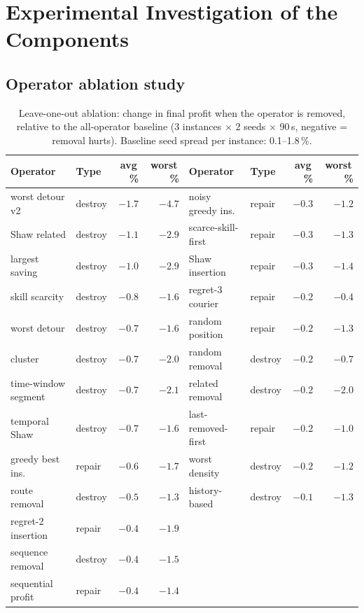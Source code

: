\documentclass[10pt, a4paper]{article}
\begin{document}
\section{Experimental Investigation of the Components}
\subsection{Operator ablation study}

\begin{table}[t]
\centering\footnotesize
\caption{Leave-one-out ablation: change in final profit when the operator is
removed, relative to the all-operator baseline (3 instances $\times$ 2 seeds
$\times$ 90\,s, negative = removal hurts). Baseline seed spread per instance:
0.1--1.8\,\%.}
\label{tab:ablation}
\begin{tabular}{@{}llrr@{\qquad}llrr@{}}
\toprule
Operator & Type & avg\,\% & worst\,\% & Operator & Type & avg\,\% & worst\,\% \\
\midrule
worst detour v2      & destroy & $-1.7$ & $-4.7$ & noisy greedy ins.   & repair & $-0.3$ & $-1.2$ \\
Shaw related         & destroy & $-1.1$ & $-2.9$ & scarce-skill-first  & repair & $-0.3$ & $-1.3$ \\
largest saving       & destroy & $-1.0$ & $-2.9$ & Shaw insertion      & repair & $-0.3$ & $-1.4$ \\
skill scarcity       & destroy & $-0.8$ & $-1.6$ & regret-3 courier    & repair & $-0.2$ & $-0.4$ \\
worst detour         & destroy & $-0.7$ & $-1.6$ & random position     & repair & $-0.2$ & $-1.3$ \\
cluster              & destroy & $-0.7$ & $-2.0$ & random removal      & destroy & $-0.2$ & $-0.7$ \\
time-window segment  & destroy & $-0.7$ & $-2.1$ & related removal     & destroy & $-0.2$ & $-2.0$ \\
temporal Shaw        & destroy & $-0.7$ & $-1.6$ & last-removed-first  & repair & $-0.2$ & $-1.0$ \\
greedy best ins.     & repair  & $-0.6$ & $-1.7$ & worst density       & destroy & $-0.2$ & $-1.2$ \\
route removal        & destroy & $-0.5$ & $-1.3$ & history-based       & destroy & $-0.1$ & $-1.3$ \\
regret-2 insertion   & repair  & $-0.4$ & $-1.9$ & & & & \\
sequence removal     & destroy & $-0.4$ & $-1.5$ & & & & \\
sequential profit    & repair  & $-0.4$ & $-1.4$ & & & & \\
\bottomrule
\end{tabular}
\end{table}
\end{document}
